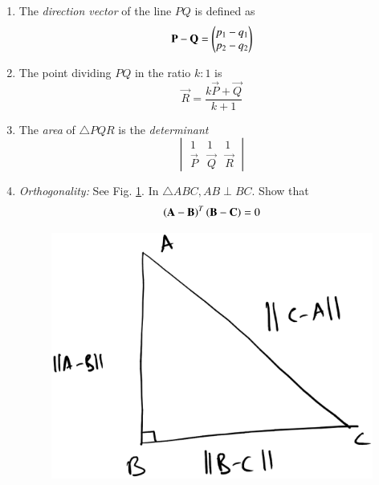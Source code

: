 \begin{enumerate}[label=\arabic*.,ref=\thesubsection.\theenumi]
%
\item The {\em direction vector} of the line $PQ$ is defined as 
\begin{align}
\mathbf{P}-\mathbf{Q} = \begin{pmatrix}p_1-q_1\\p_2-q_2\end{pmatrix}
\end{align}
%
\item The point dividing   $PQ$  in the ratio $k:1$ is
\begin{equation}
\vec{R} = \frac{k\vec{P}+\vec{Q}}{k+1}
\end{equation}
%
\item The {\em area} of $\triangle PQR$ is the {\em determinant}
\begin{equation}
\begin{vmatrix}
1 & 1 & 1
\\
\vec{P} & \vec{Q} &\vec{R}
\end{vmatrix}
\end{equation}
\item {\em Orthogonality:} See Fig. \ref{fig:orth}.  In $\triangle ABC, AB \perp BC$. Show that
\begin{equation}
\left(\mathbf{A}-\mathbf{B}\right)^T\left(\mathbf{B}-\mathbf{C}\right) = 0
\label{eq:orth}
\end{equation}
\begin{figure}
\centering
\includegraphics[width=\columnwidth]{./line/figs/orth.eps}
\caption{}
\label{fig:orth}

\end{figure}
\end{enumerate}

